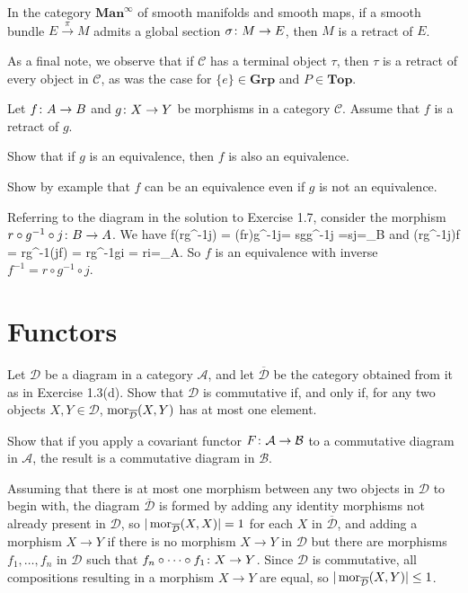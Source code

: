 In the category $\mathbf{Man}^{\infty}$ of smooth manifolds and smooth maps, if a smooth bundle $E\xrightarrow{\,\pi\,}M$ admits a global section $\sigma\colon M\to E$, then $M$ is a retract of $E$.

As a final note, we observe that if $\mathcal{C}$ has a terminal object $\tau$, then $\tau$ is a retract of every object in $\mathcal{C}$, as was the case for $\{e\}\in\mathbf{Grp}$ and $P\in\mathbf{Top}$.
\es

\bp
Let $f \colon A \to B$ and $g \colon X \to Y$ be morphisms in a category $\mathcal{C}$. Assume that $f$ is a retract of $g$.
\ben[label=(\alph*)]
\item Show that if $g$ is an equivalence, then $f$ is also an equivalence.
\item Show by example that $f$ can be an equivalence even if $g$ is not an equivalence.
\een
\ep

\bs
\ben[label=(\alph*)]
\item Referring to the diagram in the solution to Exercise 1.7, consider the morphism $r\circ g^{-1}\circ j\colon B\to A$. We have
\bse
f\circ (r\circ g^{-1}\circ j) = (f\circ r)\circ g^{-1}\circ j= s\circ g\circ g^{-1}\circ j =s\circ j=\id_B
\ese
and
\bse
(r\circ g^{-1}\circ j)\circ f = r\circ g^{-1}\circ (j\circ f) = r\circ g^{-1}\circ g\circ i = r\circ i=\id_A.
\ese
So $f$ is an equivalence with inverse $f^{-1}=r\circ g^{-1}\circ j$.
\item
\een
\es

\section{Functors}

\bx
\ben[label=(\alph*)]
\item  Let $\mathcal{D}$ be a diagram in a category $\mathcal{A}$, and let $\overline{\mathcal{D}}$ be the category obtained
from it as in Exercise 1.3(d). Show that $\mathcal{D}$ is commutative if, and only if, for any two objects $X, Y \in \mathcal{D}$, $\operatorname{mor}_{\overline{\mathcal{D}}}(X, Y )$ has at most one element.
\item Show that if you apply a covariant functor $F \colon \mathcal{A} \to \mathcal{B}$ to a commutative diagram in $\mathcal{A}$, the result is a commutative diagram in $\mathcal{B}$.
\een
\ex

\bs
\ben[label=(\alph*)]
\item Assuming that there is at most one morphism between any two objects in $\mathcal{D}$ to begin with, the diagram $\overline{\mathcal{D}}$ is formed by adding any identity morphisms not already present in $\mathcal{D}$, so $|\operatorname{mor}_{\overline{\mathcal{D}}}(X,X)|=1$ for each $X$ in $\overline{\mathcal{D}}$, and adding a morphism $X\to Y$ if there is no morphism $X\to Y$ in $\mathcal{D}$ but there are morphisms $f_1,\ldots,f_n$ in $\mathcal{D}$ such that $f_n\circ\cdots\circ f_1\colon X\to Y$. Since $\mathcal{D}$ is commutative, all compositions resulting in a morphism $X\to Y$ are equal, so $|\operatorname{mor}_{\overline{\mathcal{D}}}(X,Y)|\leq 1$.

